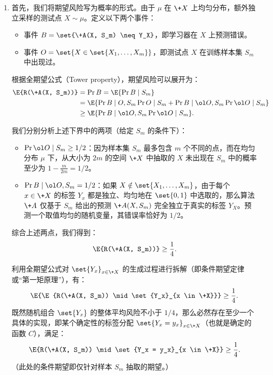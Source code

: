 \begin{solution}
    \begin{enumerate}
        \item 首先，我们将期望风险写为概率的形式。由于 $\mu$ 在 $\+X$ 上均匀分布，额外独立采样的测试点 $X \sim \mu$。定义以下两个事件：
        \begin{itemize}
            \item 事件 $B = \set{\+A(X, S_m) \neq Y_X}$，即学习器在 $X$ 上预测错误。
            \item 事件 $O = \set{X \in \set{X_1, \dots, X_m}}$，即测试点 $X$ 在训练样本集 $S_m$ 中出现过。
        \end{itemize}
        
        \noindent 根据全期望公式（Tower property），期望风险可以展开为：
        \begin{align*}
            \E{R(\+A(X, S_m))} &= \Pr{B} = \E{\Pr{B \mid S_m}} \\
            &= \E{\Pr{B \mid O, S_m}\Pr{O \mid S_m} + \Pr{B \mid \ol O, S_m}\Pr{\ol O \mid S_m}} \\
            &\ge \E{\Pr{B \mid \ol O, S_m}\Pr{\ol O \mid S_m}}.
        \end{align*}
        
        \noindent 我们分别分析上述下界中的两项（给定 $S_m$ 的条件下）：
        \begin{itemize}
            \item $\Pr{\ol O \mid S_m} \ge 1/2$：因为样本集 $S_m$ 最多包含 $m$ 个不同的点，而在均匀分布 $\mu$ 下，从大小为 $2m$ 的空间 $\+X$ 中抽取的 $X$ 未出现在 $S_m$ 中的概率至少为 $1 - \frac{m}{2m} = 1/2$。
            \item $\Pr{B \mid \ol O, S_m} = 1/2$：如果 $X \notin \set{X_1, \dots, X_m}$，由于每个 $x \in \+X$ 的标签 $Y_x$ 都是独立、均匀地在 $\set{0, 1}$ 中选取的，那么算法 $\+A$ 仅基于 $S_m$ 给出的预测 $\+A(X, S_m)$ 完全独立于真实的标签 $Y_X$。预测一个取值均匀的随机变量，其错误率恰好为 $1/2$。
        \end{itemize}
        
        \noindent 综合上述两点，我们得到：
        \[
            \E{R(\+A(X, S_m))} \ge \frac{1}{4}.
        \]
        
        \noindent 利用全期望公式对 $\set{Y_x}_{x \in \+X}$ 的生成过程进行拆解（即条件期望定律或“第一矩原理”），有：
        \[
            \E{\E{R(\+A(X, S_m)) \mid \set{Y_x}_{x \in \+X}}} \ge \frac{1}{4}.
        \]
        既然随机组合 $\set{Y_x}$ 的整体平均风险不小于 $1/4$，那么必然存在至少一个具体的实现，即某个确定性的标签分配 $\set{Y_x = y_x}_{x \in \+X}$（也就是确定的函数 $C$），满足：
        \[
            \E{R(\+A(X, S_m)) \mid \set{Y_x = y_x}_{x \in \+X}} \ge \frac{1}{4}.
        \]
        （此处的条件期望即仅针对样本 $S_m$ 抽取的期望。）


\end{enumerate}
\end{solution}
